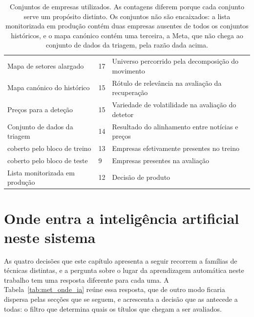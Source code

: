 \begin{table}[!htbp]
\caption[Conjuntos de empresas]{Conjuntos de empresas utilizados. As contagens diferem porque cada
conjunto serve um propósito distinto. Os conjuntos não são encaixados: a lista monitorizada em
produção contém duas empresas ausentes de todos os conjuntos históricos, e o mapa canónico contém
uma terceira, a Meta, que não chega ao conjunto de dados da triagem, pela razão dada acima.}
\label{tab:met_universos}
\centering
\small
\begin{tabular}{L{0.30\textwidth} C{0.10\textwidth} L{0.48\textwidth}}
\toprule
{} &  &  \\
\midrule
Mapa de setores alargado & 17 & Universo percorrido pela decomposição do movimento \\
Mapa canónico do histórico & 15 & Rótulo de relevância na avaliação da recuperação \\
Preços para a deteção & 15 & Variedade de volatilidade na avaliação do detetor \\
Conjunto de dados da triagem & 14 & Resultado do alinhamento entre notícias e preços \\
\quad coberto pelo bloco de treino & 13 & Empresas efetivamente presentes no treino \\
\quad coberto pelo bloco de teste & 9 & Empresas presentes na avaliação \\
Lista monitorizada em produção & 12 & Decisão de produto \\
\bottomrule
\end{tabular}
\end{table}

\section{Onde entra a inteligência artificial neste sistema}
\label{sec:met_onde_ia}

As quatro decisões que este capítulo apresenta a seguir recorrem a famílias de técnicas distintas, e a
pergunta sobre o lugar da aprendizagem automática neste trabalho tem uma resposta diferente
para cada uma. A Tabela~\ref{tab:met_onde_ia} reúne essa resposta, que de outro modo ficaria dispersa pelas
secções que se seguem, e acrescenta a decisão que as antecede a todas: o filtro que determina
quais os títulos que chegam a ser avaliados.

